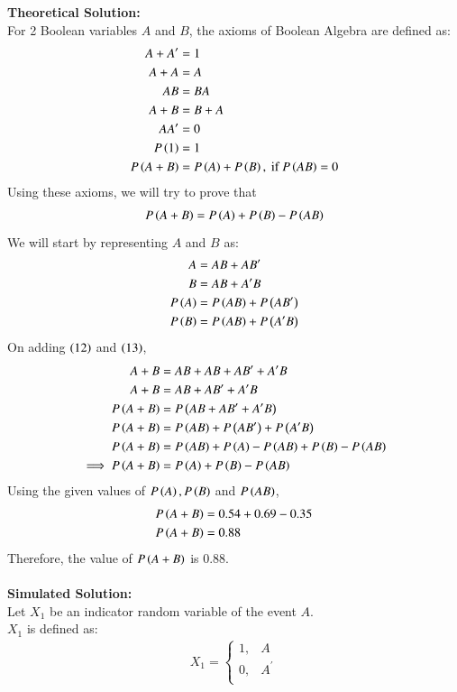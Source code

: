 \documentclass[journal]{IEEEtran}
\begin{document}
\textbf{Theoretical Solution:\\}
For 2 Boolean variables $A$ and $B$, the axioms of Boolean Algebra are defined as:
\begin{align}
	A + A^\prime &= 1\\
	A + A &= A\\
	AB &= BA\\
	A + B &= B + A\\
	AA^\prime &= 0\\
	P\left(1\right) &= 1\\
	P\left(A + B\right) &= P\left(A\right) + P\left(B\right), \text{ if } P\left(AB\right) = 0
\end{align}
Using these axioms, we will try to prove that
\begin{align}
	P\left(A + B\right) = P\left(A\right) + P\left(B\right) - P\left(AB\right)
\end{align}
We will start by representing $A$ and $B$ as:
\begin{align}
	A &= AB + AB^\prime\\
	B &= AB + A^\prime B\\
	P\left(A\right) &= P\left(AB\right) + P\left(AB^\prime\right)\\
	P\left(B\right) &= P\left(AB\right) + P\left(A^\prime B\right)
\end{align}
On adding $\left(12\right)$ and $\left(13\right)$,
\begin{align}
	A + B &= AB + AB + AB^\prime + A^\prime B\\
	A + B &= AB + AB^\prime + A^\prime B\\
	P\left(A + B\right) &= P\left(AB + AB^\prime + A^\prime B\right)\\
	P\left(A + B\right) &= P\left(AB\right) + P\left(AB^\prime\right) + P\left(A^\prime B\right)\\
	P\left(A + B\right) &= P\left(AB\right) + P\left(A\right) - P\left(AB\right) + P\left(B\right) - P\left(AB\right)\\
	\implies P\left(A + B\right) &= P\left(A\right) + P\left(B\right) - P\left(AB\right)
\end{align}
Using the given values of $P\left(A\right), P\left(B\right)$ and $P\left(AB\right)$,
\begin{align}
	P\left(A + B\right) &= 0.54 + 0.69 - 0.35\\
	P\left(A + B\right) &= 0.88
\end{align}
Therefore, the value of $P\left(A + B\right)$ is $0.88$.\\\\
\textbf{Simulated Solution:\\}
Let $X_1$ be an indicator random variable of the event $A$.\\
$X_1$ is defined as:
\begin{align}
	X_1 =
	\begin{cases}
		1 ,& A\\
		0 ,& A^\prime\\
	\end{cases}
\end{align}
\end{document}
